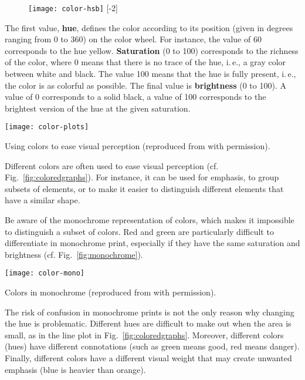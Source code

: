 \begin{figure}
\centering
\texttt{[image: color-hsb]}
[-2\baselineskip]
\end{figure}

The first value, \textbf{hue}, defines the color according to its position (given in degrees ranging from 0 to 360) on the color wheel. For instance, the value of 60 corresponds to the hue yellow. \textbf{Saturation} (0 to 100) corresponds to the richness of the color, where 0 means that there is no trace of the hue, i.\,e., a gray color between white and black. The value 100 means that the hue is fully present, i.\,e., the color is as colorful as possible. The final value is \textbf{brightness} (0 to 100). A value of 0 corresponds to a solid black, a value of 100 corresponds to the brightest version of the hue at the given saturation.

\begin{marginfigure}
\centering
\texttt{[image: color-plots]}
\caption{\label{fig:coloredgraphs} Using colors to ease visual perception (reproduced from \cite{Carter12} with permission).}%
\end{marginfigure}

Different colors are often used to ease visual perception (cf. Fig.~\ref{fig:coloredgraphs}). For instance, it can be used for emphasis, to group subsets of elements, or to make it easier to distinguish different elements that have a similar shape.

Be aware of the monochrome representation of colors, which makes it impossible to distinguish a subset of colors. Red and green are particularly difficult to differentiate in monochrome print, especially if they have the same saturation and brightness (cf. Fig.~\ref{fig:monochrome}).

\begin{marginfigure}[-5\baselineskip]
\centering
\texttt{[image: color-mono]}
\caption{\label{fig:monochrome} Colors in monochrome (reproduced from \cite{Carter12} with permission).}
\end{marginfigure}

The risk of confusion in monochrome prints is not the only reason why changing the hue is problematic. Different hues are difficult to make out when the area is small, as in the line plot in  Fig.~\ref{fig:coloredgraphs}. Moreover, different colors (hues) have different connotations (such as green means good, red means danger). Finally, different colors have a different visual weight that may create unwanted emphasis (blue is heavier than orange).

